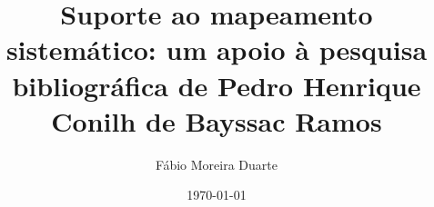 \documentclass{report}
\title{Suporte ao mapeamento sistemático: um apoio à pesquisa bibliográfica de Pedro Henrique Conilh de Bayssac Ramos}
\author{Fábio Moreira Duarte}
\date{\today}
\begin{document}
\maketitle
\tableofcontents{}



\end{document}
